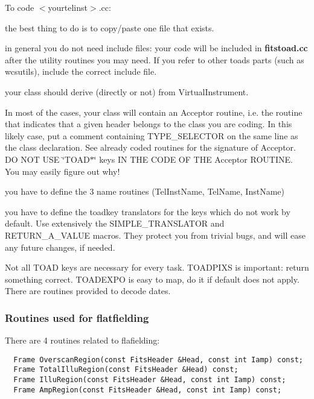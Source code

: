 To code $<$yourtelinst$>$.cc:\begin{CompactItemize}
\item 
the best thing to do is to copy/paste one file that exists.\item 
in general you do not need include files: your code will be included in {\bf fitstoad.cc} after the utility routines you may need. If you refer to other toads parts (such as wcsutils), include the correct include file.\end{CompactItemize}
\begin{CompactItemize}
\item 
your class should derive (directly or not) from Virtual\-Instrument.\item 
In most of the cases, your class will contain an Acceptor routine, i.e. the routine that indicates that a given header belongs to the class you are coding. In this likely case, put a comment containing  TYPE\_\-SELECTOR on the same line as the class declaration. See already coded routines for the signature of Acceptor. DO NOT USE \char`\"{}TOAD$\ast$\char`\"{} keys IN THE CODE OF THE Acceptor ROUTINE. You may easily figure out why!\end{CompactItemize}
\begin{CompactItemize}
\item 
you have to define the 3 name routines (Tel\-Inst\-Name, Tel\-Name, Inst\-Name)\item 
you have to define the toadkey translators for the keys which do not work by default. Use extensively the SIMPLE\_\-TRANSLATOR and RETURN\_\-A\_\-VALUE macros. They protect you from trivial bugs, and will ease any future changes, if needed.\end{CompactItemize}
Not all TOAD keys are necessary for every task. TOADPIXS is important: return something correct. TOADEXPO is easy to map, do it if default does not apply. There are routines provided to decode dates.

\subsubsection{Routines used  for flatfielding}\label{functions_for_flatfielding}


There are 4 routines related to flafielding: \footnotesize\begin{verbatim}  Frame OverscanRegion(const FitsHeader &Head, const int Iamp) const;
  Frame TotalIlluRegion(const FitsHeader &Head) const;
  Frame IlluRegion(const FitsHeader &Head, const int Iamp) const;
  Frame AmpRegion(const FitsHeader &Head, const int Iamp) const;\end{verbatim}\normalsize 


